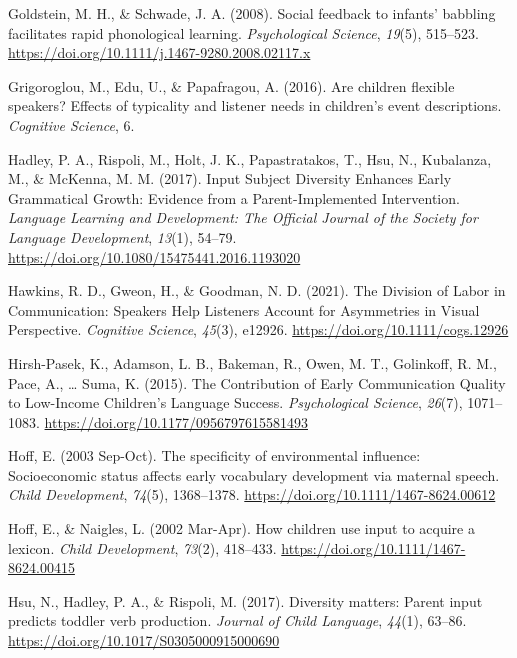 \documentclass[
  man]{apa6}
\newlength{\cslhangindent}
\newlength{\cslentryspacingunit} %
\newenvironment{CSLReferences}[2] %
 {%
  \setlength{\parindent}{0pt}
  \ifodd #1
  \let\oldpar\par
  \def\par{\hangindent=\cslhangindent\oldpar}
  \fi
  \setlength{\parskip}{#2\cslentryspacingunit}
 }%
 {}
\begin{document}
\begin{CSLReferences}{1}{0}
\leavevmode{}%
Goldstein, M. H., \& Schwade, J. A. (2008). Social feedback to infants' babbling facilitates rapid phonological learning. \emph{Psychological Science}, \emph{19}(5), 515--523. \url{https://doi.org/10.1111/j.1467-9280.2008.02117.x}

\leavevmode{}%
Grigoroglou, M., Edu, U., \& Papafragou, A. (2016). Are children flexible speakers? {Effects} of typicality and listener needs in children's event descriptions. \emph{Cognitive Science}, 6.

\leavevmode{}%
Hadley, P. A., Rispoli, M., Holt, J. K., Papastratakos, T., Hsu, N., Kubalanza, M., \& McKenna, M. M. (2017). Input {Subject Diversity Enhances Early Grammatical Growth}: {Evidence} from a {Parent-Implemented Intervention}. \emph{Language Learning and Development: The Official Journal of the Society for Language Development}, \emph{13}(1), 54--79. \url{https://doi.org/10.1080/15475441.2016.1193020}

\leavevmode{}%
Hawkins, R. D., Gweon, H., \& Goodman, N. D. (2021). The {Division} of {Labor} in {Communication}: {Speakers Help Listeners Account} for {Asymmetries} in {Visual Perspective}. \emph{Cognitive Science}, \emph{45}(3), e12926. \url{https://doi.org/10.1111/cogs.12926}

\leavevmode{}%
Hirsh-Pasek, K., Adamson, L. B., Bakeman, R., Owen, M. T., Golinkoff, R. M., Pace, A., \ldots{} Suma, K. (2015). The {Contribution} of {Early Communication Quality} to {Low-Income Children}'s {Language Success}. \emph{Psychological Science}, \emph{26}(7), 1071--1083. \url{https://doi.org/10.1177/0956797615581493}

\leavevmode{}%
Hoff, E. (2003 Sep-Oct). The specificity of environmental influence: Socioeconomic status affects early vocabulary development via maternal speech. \emph{Child Development}, \emph{74}(5), 1368--1378. \url{https://doi.org/10.1111/1467-8624.00612}

\leavevmode{}%
Hoff, E., \& Naigles, L. (2002 Mar-Apr). How children use input to acquire a lexicon. \emph{Child Development}, \emph{73}(2), 418--433. \url{https://doi.org/10.1111/1467-8624.00415}

\leavevmode{}%
Hsu, N., Hadley, P. A., \& Rispoli, M. (2017). Diversity matters: Parent input predicts toddler verb production. \emph{Journal of Child Language}, \emph{44}(1), 63--86. \url{https://doi.org/10.1017/S0305000915000690}


\end{CSLReferences}
\end{document}
